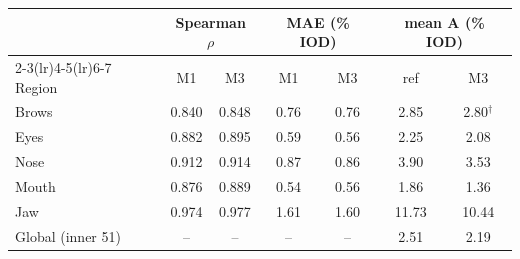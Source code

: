 \begin{tabular}{@{}lcccccc@{}}
\toprule
 & \multicolumn{2}{c}{Spearman $\rho$} & \multicolumn{2}{c}{MAE (\% IOD)} & \multicolumn{2}{c}{mean A (\% IOD)}\\
\cmidrule(lr){2-3}\cmidrule(lr){4-5}\cmidrule(lr){6-7}
Region & M1 & M3 & M1 & M3 & ref & M3\\
\midrule
Brows & 0.840 & 0.848 & 0.76 & 0.76 & 2.85 & 2.80$^{\dagger}$\\
Eyes & 0.882 & 0.895 & 0.59 & 0.56 & 2.25 & 2.08\\
Nose & 0.912 & 0.914 & 0.87 & 0.86 & 3.90 & 3.53\\
Mouth & 0.876 & 0.889 & 0.54 & 0.56 & 1.86 & 1.36\\
Jaw & 0.974 & 0.977 & 1.61 & 1.60 & 11.73 & 10.44\\
\midrule
Global (inner 51) & -- & -- & -- & -- & 2.51 & 2.19\\
\bottomrule
\end{tabular}

